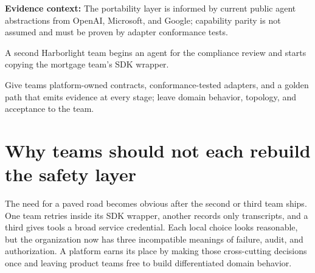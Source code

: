 


\begin{bookquote}

\textbf{Evidence context:} The portability layer is informed by current public agent abstractions from OpenAI, Microsoft, and Google; capability parity is not assumed and must be proven by adapter conformance tests. \textbf{}

\end{bookquote}

\begin{bookcallout}
A second Harborlight team begins an agent for the compliance review and starts copying the mortgage team's SDK wrapper.
\end{bookcallout}

\begin{bookcallout}
Give teams platform-owned contracts, conformance-tested adapters, and a golden path that emits evidence at every stage; leave domain behavior, topology, and acceptance to the team.
\end{bookcallout}

\section{Why teams should not each rebuild the safety layer}

The need for a paved road becomes obvious after the second or third team ships. One team retries inside its SDK wrapper, another records only transcripts, and a third gives tools a broad service credential. Each local choice looks reasonable, but the organization now has three incompatible meanings of failure, audit, and authorization. A platform earns its place by making those cross-cutting decisions once and leaving product teams free to build differentiated domain behavior.\par

